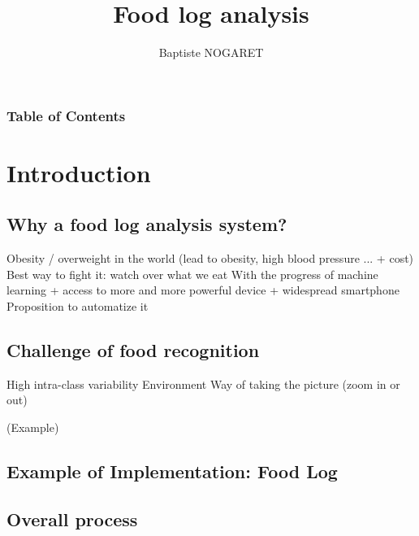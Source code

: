 \documentclass[aspectratio=169]{beamer}
\author{Baptiste NOGARET}
\title{Food log analysis}
\let\oldsection\section
\renewcommand{\section}[1]{
    \oldsection{#1}	
    \subsection{}
}
\newenvironment{myframe}[1][t]{\begin{frame}[#1]{\secname}{\subsecname}}{\end{frame}}
\begin{document}
	
	\begin{frame}[plain]
		\titlepage
	\end{frame}
    
    \begin{frame}
        \frametitle{Table of Contents}
        \tableofcontents
    \end{frame}
    
    \section{Introduction}
    
    \subsection{Why a food log analysis system?}
    
	\begin{myframe}
        Obesity / overweight in the world (lead to obesity, high blood pressure ... + cost)
        Best way to fight it: watch over what we eat
        With the progress of machine learning + access to more and more powerful device + widespread smartphone
        Proposition to automatize it
	\end{myframe}
    
    \subsection{Challenge of food recognition}
    
    \begin{myframe}
        High intra-class variability
        Environment
        Way of taking the picture (zoom in or out)
        
        (Example)
    \end{myframe}
    
    \subsection{Example of Implementation: Food Log}
    
    \begin{myframe}
        
    \end{myframe}
    
    \subsection{Overall process}
    
\end{document}
